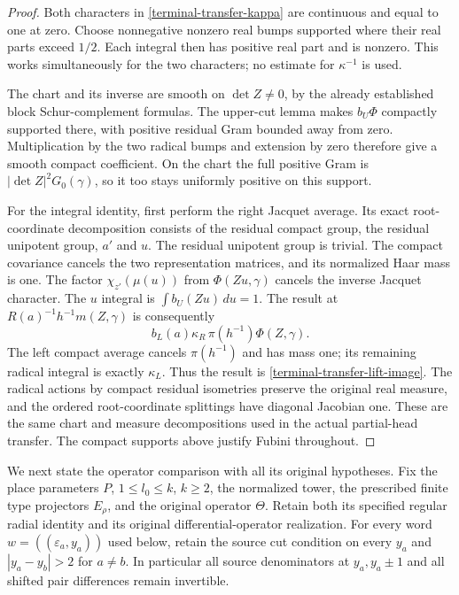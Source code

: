 \begin{proof}
Both characters in \eqref{terminal-transfer-kappa} are
continuous and equal to one at zero.  Choose nonnegative
nonzero real bumps supported where their real parts exceed
$1/2$.  Each integral then has positive real part and is
nonzero.  This works simultaneously for the two characters;
no estimate for $\kappa^{-1}$ is used.

The chart and its inverse are smooth on $\det Z\ne0$, by the
already established block Schur-complement formulas.  The
upper-cut lemma makes $b_U\Phi$ compactly supported there,
with positive residual Gram bounded away from zero.
Multiplication by the two radical bumps and extension by
zero therefore give a smooth compact coefficient.  On the
chart the full positive Gram is
$|\det Z|^2G_0(\gamma)$, so it too stays uniformly positive
on this support.

For the integral identity, first perform the right Jacquet
average.  Its exact root-coordinate decomposition consists
of the residual compact group, the residual unipotent group,
$a'$ and $u$.  The residual unipotent group is trivial.
The compact covariance cancels the two representation
matrices, and its normalized Haar mass is one.  The factor
$\chi_{z'}(\mu(u))$ from $\Phi(Zu,\gamma)$ cancels the
inverse Jacquet character.  The $u$ integral is
$\int b_U(Zu)\,du=1$.  The result at
$R(a)^{-1}h^{-1}m(Z,\gamma)$ is consequently
\[
       b_L(a)\kappa_R\,\pi(h^{-1})\Phi(Z,\gamma).
\]
The left compact average cancels $\pi(h^{-1})$ and has mass
one; its remaining radical integral is exactly $\kappa_L$.
Thus the result is \eqref{terminal-transfer-lift-image}.
The radical actions by compact residual isometries preserve
the original real measure, and the ordered root-coordinate
splittings have diagonal Jacobian one.  These are the same
chart and measure decompositions used in the actual
partial-head transfer.  The compact supports above justify
Fubini throughout.
\end{proof}

We next state the operator comparison with all its original
hypotheses.  Fix the place parameters $P$, $1\le l_0\le k$,
$k\ge2$, the normalized tower, the prescribed finite type
projectors $E_\rho$, and the original operator $\Theta$.
Retain both its specified regular radial identity and its
original differential-operator realization.  For every word
$w=((\varepsilon_a,y_a))$ used below, retain the source cut
condition on every $y_a$ and $|y_a-y_b|>2$ for $a\ne b$.
In particular all source denominators at $y_a,y_a\pm1$ and
all shifted pair differences remain invertible.

